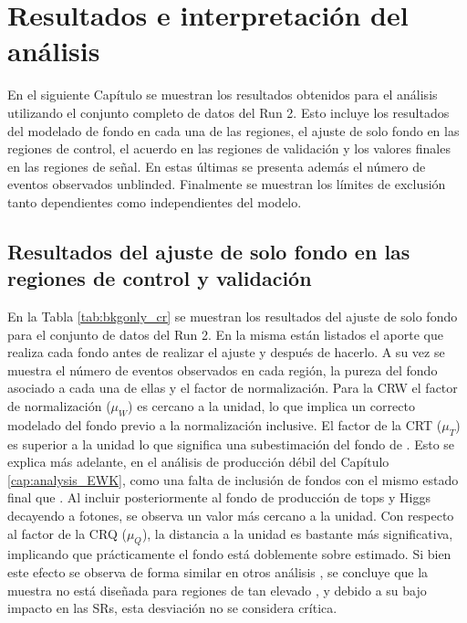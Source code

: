 \chapter{Resultados e interpretación del análisis}

En el siguiente Capítulo se muestran los resultados obtenidos para el análisis utilizando el conjunto completo de datos del Run 2. Esto incluye los resultados del modelado de fondo en cada una de las regiones, el ajuste de solo fondo en las regiones de control, el acuerdo en las regiones de validación y los valores finales en las regiones de señal. En estas últimas se presenta además el número de eventos observados unblinded. Finalmente se muestran los límites de exclusión tanto dependientes como independientes del modelo. 

\section{Resultados del ajuste de solo fondo en las regiones de control y validación}


En la Tabla \ref{tab:bkgonly_cr} se muestran los resultados del ajuste de solo fondo para el conjunto de datos del Run 2. En la misma están listados el aporte que realiza cada fondo antes de realizar el ajuste y después de hacerlo. A su vez se muestra el número de eventos observados en cada región, la pureza del fondo asociado a cada una de ellas y el factor de normalización. 
Para la CRW el factor de normalización ($\mu_W$) es cercano a la unidad, lo que implica un correcto modelado del fondo previo a la normalización inclusive. El factor de la CRT ($\mu_T$) es superior a la unidad lo que significa una subestimación del fondo de \ttbarph. Esto se explica más adelante, en el análisis de producción débil del Capítulo \ref{cap:analysis_EWK}, como una falta de inclusión de fondos con el mismo estado final que \ttbarph. Al incluir posteriormente al fondo de producción de tops y Higgs decayendo a fotones, se observa un valor más cercano a la unidad. Con respecto al factor de la CRQ ($\mu_Q$), la distancia a la unidad es bastante más significativa, implicando que prácticamente el fondo está doblemente sobre estimado. Si bien este efecto se observa de forma similar en otros análisis \cite{Alonso:2689095} 
, se concluye que la muestra no está diseñada para regiones de tan elevado \met, y debido a su bajo impacto en las SRs, esta desviación no se considera crítica. 

